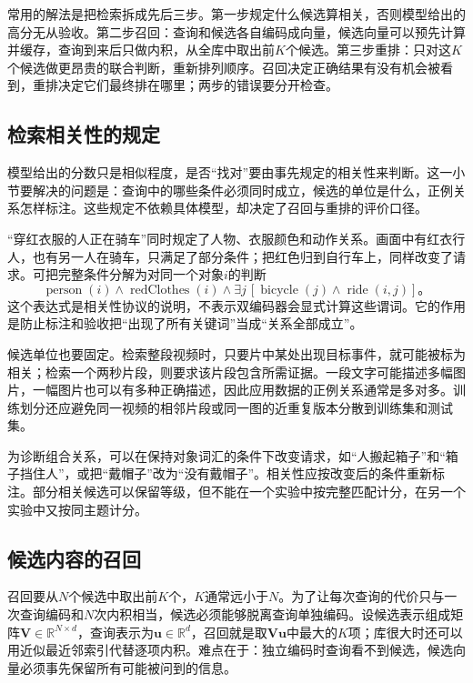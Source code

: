 常用的解法是把检索拆成先后三步。第一步规定什么候选算相关，否则模型给出的高分无从验收。第二步召回：查询和候选各自编码成向量，候选向量可以预先计算并缓存，查询到来后只做内积，从全库中取出前$K$个候选。第三步重排：只对这$K$个候选做更昂贵的联合判断，重新排列顺序。召回决定正确结果有没有机会被看到，重排决定它们最终排在哪里；两步的错误要分开检查。

\subsection{检索相关性的规定}
\label{sec:vision-understanding-relevance}

模型给出的分数只是相似程度，是否“找对”要由事先规定的相关性来判断。这一小节要解决的问题是：查询中的哪些条件必须同时成立，候选的单位是什么，正例关系怎样标注。这些规定不依赖具体模型，却决定了召回与重排的评价口径。

“穿红衣服的人正在骑车”同时规定了人物、衣服颜色和动作关系。画面中有红衣行人，也有另一人在骑车，只满足了部分条件；把红色归到自行车上，同样改变了请求。可把完整条件分解为对同一个对象$i$的判断
\[
  \operatorname{person}(i)\land\operatorname{redClothes}(i)
  \land\exists j\,[\operatorname{bicycle}(j)\land\operatorname{ride}(i,j)]\text{。}
\]
这个表达式是相关性协议的说明，不表示双编码器会显式计算这些谓词。它的作用是防止标注和验收把“出现了所有关键词”当成“关系全部成立”。

候选单位也要固定。检索整段视频时，只要片中某处出现目标事件，就可能被标为相关；检索一个两秒片段，则要求该片段包含所需证据。一段文字可能描述多幅图片，一幅图片也可以有多种正确描述，因此应用数据的正例关系通常是多对多。训练划分还应避免同一视频的相邻片段或同一图的近重复版本分散到训练集和测试集。

为诊断组合关系，可以在保持对象词汇的条件下改变请求，如“人搬起箱子”和“箱子挡住人”，或把“戴帽子”改为“没有戴帽子”。相关性应按改变后的条件重新标注。部分相关候选可以保留等级，但不能在一个实验中按完整匹配计分，在另一个实验中又按同主题计分。

\subsection{候选内容的召回}
\label{sec:vision-understanding-candidate-matching}

召回要从$N$个候选中取出前$K$个，$K$通常远小于$N$。为了让每次查询的代价只与一次查询编码和$N$次内积相当，候选必须能够脱离查询单独编码。设候选表示组成矩阵$\bm V\in\mathbb R^{N\times d}$，查询表示为$\bm u\in\mathbb R^{d}$，召回就是取$\bm V\bm u$中最大的$K$项；库很大时还可以用近似最近邻索引代替逐项内积。难点在于：独立编码时查询看不到候选，候选向量必须事先保留所有可能被问到的信息。

